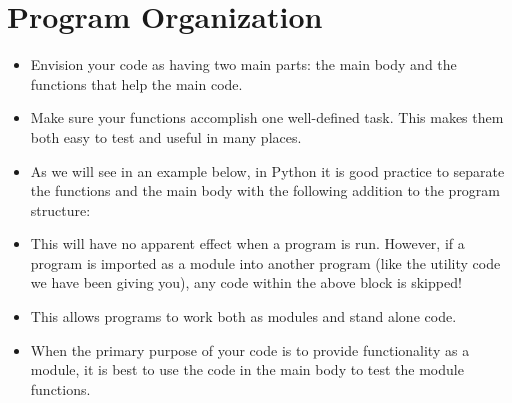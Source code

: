\documentclass[letterpaper,10pt,english]{sphinxmanual}
\begin{document}
\section{Program Organization}
\label{\detokenize{lecture_notes/lec11_conditionals2:program-organization}}\begin{itemize}
\item {} 
Envision your code as having two main parts: the main body and the
functions that help the main code.

\item {} 
Make sure your functions accomplish one well-defined task. This
makes them both easy to test and useful in many places.

\item {} 
As we will see in an example below, in Python it is good practice to
separate the functions and the main body with the following
addition to the program structure:

\begin{sphinxVerbatim}[commandchars=\\\{\}]
   
\end{sphinxVerbatim}

\item {} 
This will have no apparent effect when a program is run.
However, if a program is imported as a module into another program
(like the utility code we have been giving you), any code within the
above  block is skipped!

\item {} 
This allows programs to work both as modules and stand alone
code.

\item {} 
When the primary purpose of your code is to provide functionality
as a module, it is best to use the code in the main body to test
the module functions.

\end{itemize}
\end{document}
